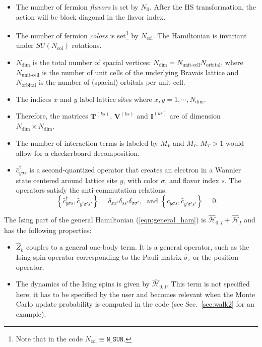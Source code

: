 \begin{itemize}
\item The number of fermion \emph{flavors} is set by $N_{\mathrm{fl}}$.  After the HS transformation, the action will be block diagonal in the flavor index. 
\item The number of fermion \emph{colors} is set\footnote{Note that  in the code $ N_{\mathrm{col}} \equiv \texttt{N\_{SUN}} $.} by $N_{\mathrm{col}}$.    The Hamiltonian is invariant under  $SU(N_{\mathrm{col}})$  rotations.
\item $N_{\mathrm{dim}}$ is the total number of spacial vertices: $N_{\mathrm{dim}}=N_{\text{unit-cell}} N_{\mathrm{orbital}}$, where $N_{\text{unit-cell}}$ is the number of unit cells of the underlying Bravais lattice and $N_{\mathrm{orbital}}$ is the number of (spacial) orbitals per unit cell.
\item The indices $x$ and $y$ label lattice sites where $x,y=1,\cdots, N_{\mathrm{dim}}$. 
\item Therefore, the  matrices $\bm{T}^{(k s)}$, $\bm{V}^{(ks)}$  and $\bm{I}^{(ks)}$ are  of dimension $N_{\mathrm{dim}}\times N_{\mathrm{dim}}$.
\item The number of interaction terms  is labeled by $M_V$   and $M_I$.   $M_T> 1 $ would allow for a checkerboard decomposition.
\item $\hat{c}^{\dagger}_{y \sigma s} $ is a second-quantized operator that creates an electron in a Wannier state centered around lattice site $y$, with color $\sigma$, and  flavor index $s$.  The operators satisfy the anti-commutation relations: 
\begin{equation}
	\left\{ \hat{c}^{\dagger}_{y \sigma s},    \hat{c}^{\phantom\dagger}_{y' \sigma' s'}  \right\}   =   \delta_{xx'}  \delta_{ss'} \delta_{\sigma\sigma'},   
	\; \text{ and } \left\{ \hat{c}^{\phantom\dagger}_{y \sigma s},    \hat{c}^{\phantom\dagger}_{y' \sigma' s'}  \right\}   =0.
\end{equation}

\end{itemize}
The Ising part of the general Hamiltonian (\ref{eqn:general_ham}) is $\hat{\mathcal{H}}_{0,I}+ \hat{\mathcal{H}}_{I}$ and  has the following properties:
\begin{itemize}
\item $\hat{Z}_k$ couples to a general one-body term. It is a general operator, such as the Ising spin operator corresponding to the Pauli matrix $\hat{\sigma}_{z}$ or the position operator.
\item  The dynamics of the Ising spins is given by $\hat{\mathcal{H}}_{0,I}$. This term is not specified here; 
it has to be specified by the user and becomes relevant when the Monte Carlo update probability is computed in the code (see Sec.~\ref{sec:walk2} for an example).
\end{itemize}
